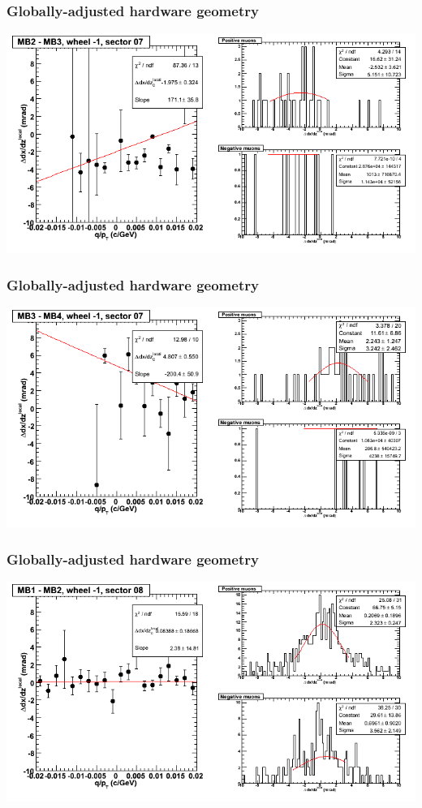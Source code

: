 \documentclass[compress]{beamer}
\begin{document}
\begin{frame}
\frametitle{Globally-adjusted hardware geometry}
\includegraphics[width=\linewidth]{NOV4_segdiffs_HW/dt13_slope_B_07_23.png}
\end{frame}

\begin{frame}
\frametitle{Globally-adjusted hardware geometry}
\includegraphics[width=\linewidth]{NOV4_segdiffs_HW/dt13_slope_B_07_34.png}
\end{frame}

\begin{frame}
\frametitle{Globally-adjusted hardware geometry}
\includegraphics[width=\linewidth]{NOV4_segdiffs_HW/dt13_slope_B_08_12.png}
\end{frame}
\end{document}

